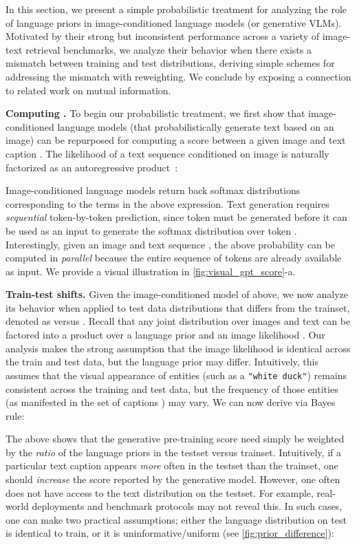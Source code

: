 \documentclass{article} \usepackage{iclr2024_conference,times}
\begin{document}
In this section, we present a simple probabilistic treatment for analyzing the role of language priors in image-conditioned language models (or generative VLMs). Motivated by their strong but inconsistent performance across a variety of image-text retrieval benchmarks, we analyze their behavior when there exists a mismatch between training and test distributions, deriving simple schemes for addressing the mismatch with reweighting. We conclude by exposing a connection to related work on mutual information.





{\bf Computing .} To begin our probabilistic treatment, we first show that image-conditioned language models (that probabilistically generate text based on an image) can be repurposed for computing a score between a given image  and text caption . The likelihood of a text sequence  conditioned on image  is naturally factorized as an autoregressive product~\citep{bengio2003neural}:

Image-conditioned language models return back  softmax distributions corresponding to the  terms in the above expression. Text generation requires {\em sequential} token-by-token prediction, since token  must be generated before it can be used as an input to generate the softmax distribution over token . Interestingly, given an image  and text sequence , the above probability can be computed in {\em parallel} because the entire sequence of tokens  are already available as input. We provide a visual illustration in \autoref{fig:visual_gpt_score}-a.



{\bf Train-test shifts.} Given the image-conditioned model of  above, we now analyze its behavior when applied to test data distributions that differs from the trainset, denoted as  versus . 
Recall that any joint distribution over images and text can be factored into a product over a language prior and an image likelihood . Our analysis makes the strong assumption that the image likelihood  is identical across the train and test data, but the language prior  may differ. Intuitively, this assumes that the visual appearance of entities (such as a {\tt "white duck"}) remains consistent across the training and test data, but the frequency of those entities (as manifested in the set of captions ) may vary. We can now derive  via Bayes rule:

The above shows that the generative pre-training score  need simply be weighted by the {\em ratio} of the language priors in the testset versus trainset. Intuitively, if a particular text caption appears {\em more} often in the testset than the trainset, one should {\em increase} the score reported by the generative model. However, one often does not have access to the text distribution on the testset. For example, real-world deployments and benchmark protocols may not reveal this. In such cases, one can make two practical assumptions; either the language distribution on test is identical to train, or it is uninformative/uniform (see \autoref{fig:prior_difference}):
\end{document}

